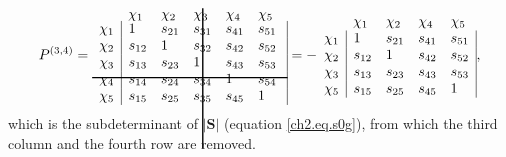 \begin{equation}
P^{(3,4)}=
\begin{array}{llllll}
 & \hskip 53.0 pt \hbox{\lower 93pt\hbox{\vrule height100pt width 1.0pt}}\hskip-54.0pt \chi_1 & \chi_2 & \chi_3 & \chi_4 & \chi_5 \\
 \noalign{\vskip-91pt}
 \chi_1 & \multicolumn{1}{|l}{ 1 } & s_{21} & s_{31} & s_{41} & \multicolumn{1}{l|}{ s_{51} } \\
 \chi_2 & \multicolumn{1}{|l}{ s_{12} } & 1 & s_{32} & s_{42} & \multicolumn{1}{l|}{ s_{52} } \\
 \chi_3 & \multicolumn{1}{|l}{ s_{13} } & s_{23} & 1 & s_{43} & \multicolumn{1}{l|}{ s_{53} } \\
 \chi_4 & \multicolumn{1}{|l}{ s_{14} } & s_{24} & s_{34} & 1 & \multicolumn{1}{l|}{ s_{54} } \\
 \noalign{\vskip-8pt}
 \multispan6\hbox{\vrule  height 1.0 pt width140pt}\cr
 \noalign{\vskip 7pt}
 \chi_5 & \multicolumn{1}{|l}{ s_{15} } & s_{25} & s_{35} & s_{45} & \multicolumn{1}{l|}{ 1 }
\end{array} =
- \begin{array}{lllll}
 &  \chi_1 & \chi_2 & \chi_4 & \chi_5 \\
 \chi_1 & \multicolumn{1}{|l}{ 1 } & s_{21} & s_{41} & \multicolumn{1}{l|}{ s_{51} } \\
 \chi_2 & \multicolumn{1}{|l}{ s_{12} } & 1 & s_{42} & \multicolumn{1}{l|}{ s_{52} } \\
 \chi_3 & \multicolumn{1}{|l}{ s_{13} } & s_{23} & s_{43} & \multicolumn{1}{l|}{s_{53}} \\
 \chi_5 & \multicolumn{1}{|l}{ s_{15} } & s_{25} & s_{45} & \multicolumn{1}{l|}{1}
\end{array},
\label{ch2.eq.p0exampg}
\end{equation}
which is the subdeterminant of $|\mathbf{S}|$ (equation \ref{ch2.eq.s0g}), from which the third column and the fourth row are removed.

